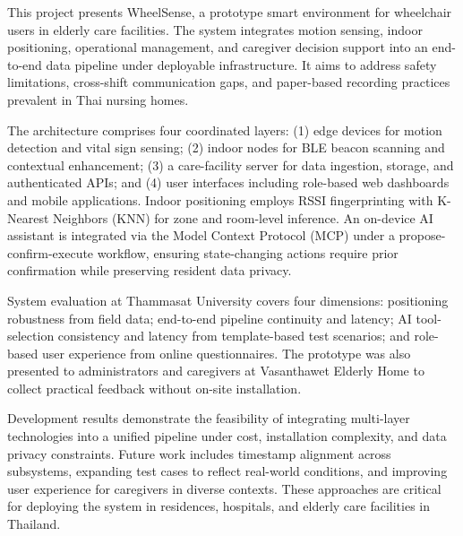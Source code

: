 
This project presents WheelSense, a prototype smart environment for wheelchair users in elderly care facilities. The system integrates motion sensing, indoor positioning, operational management, and caregiver decision support into an end-to-end data pipeline under deployable infrastructure. It aims to address safety limitations, cross-shift communication gaps, and paper-based recording practices prevalent in Thai nursing homes.

The architecture comprises four coordinated layers: (1) edge devices for motion detection and vital sign sensing; (2) indoor nodes for BLE beacon scanning and contextual enhancement; (3) a care-facility server for data ingestion, storage, and authenticated APIs; and (4) user interfaces including role-based web dashboards and mobile applications. Indoor positioning employs RSSI fingerprinting with K-Nearest Neighbors (KNN) for zone and room-level inference. An on-device AI assistant is integrated via the Model Context Protocol (MCP) under a propose-confirm-execute workflow, ensuring state-changing actions require prior confirmation while preserving resident data privacy.

System evaluation at Thammasat University covers four dimensions: positioning robustness from field data; end-to-end pipeline continuity and latency; AI tool-selection consistency and latency from template-based test scenarios; and role-based user experience from online questionnaires. The prototype was also presented to administrators and caregivers at Vasanthawet Elderly Home to collect practical feedback without on-site installation.

Development results demonstrate the feasibility of integrating multi-layer technologies into a unified pipeline under cost, installation complexity, and data privacy constraints. Future work includes timestamp alignment across subsystems, expanding test cases to reflect real-world conditions, and improving user experience for caregivers in diverse contexts. These approaches are critical for deploying the system in residences, hospitals, and elderly care facilities in Thailand.
